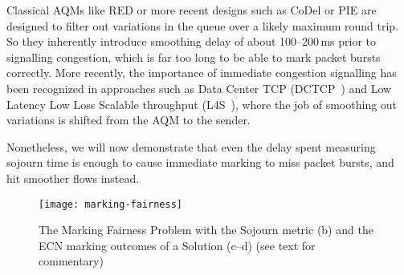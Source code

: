 Classical AQMs like RED or more recent designs such as CoDel or PIE are designed to filter out variations in the queue over a likely maximum round trip. So they inherently introduce smoothing delay of about 100--200\,ms prior to signalling congestion, which is far too long to be able to mark packet bursts correctly. More recently, the importance of immediate congestion signalling has been recognized in approaches such as Data Center TCP (DCTCP~\cite{Alizadeh10:DCTCP}) and Low Latency Low Loss Scalable throughput (L4S~\cite{Briscoe16a:l4s-arch_ID}), where the job of smoothing out variations is shifted from the AQM to the sender.

Nonetheless, we will now demonstrate that even the delay spent measuring sojourn time is enough to cause immediate marking to miss packet bursts, and hit smoother flows instead. 

\begin{figure}[h]
	\centering
	\texttt{[image: marking-fairness]}
	\caption{The Marking Fairness Problem with the Sojourn metric (b) and the ECN marking outcomes of a Solution (c--d) (see text for commentary)}\label{fig:marking-fairness}
\end{figure}


